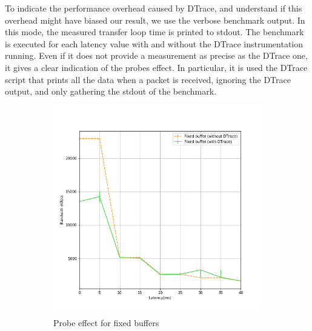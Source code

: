\documentclass[a4paper,10pt]{article}
\begin{document}
To indicate the performance overhead caused by DTrace, and understand if this overhead might have biased our result, we use the verbose benchmark output. In this mode, the measured transfer loop time is printed to stdout. The benchmark is executed for each latency value with and without the DTrace instrumentation running. Even if it does not provide a measurement as precise as the DTrace one, it gives a clear indication of the probes effect.
In particular, it is used the DTrace script that prints all the data when a packet is received, ignoring the DTrace output, and only gathering the stdout of the benchmark.
\begin{figure}[]
\begin{subfigure}{0.5\textwidth}
   \centering
   \includegraphics[width=\textwidth]{images/fixed_probe_effect.png}
   \caption{Probe effect for fixed buffers}
   \label{fig:fixed_probe}
\end{subfigure}
\qquad
\begin{subfigure}{0.5\textwidth}
   \centering

\end{subfigure}
\end{figure}
\end{document}
